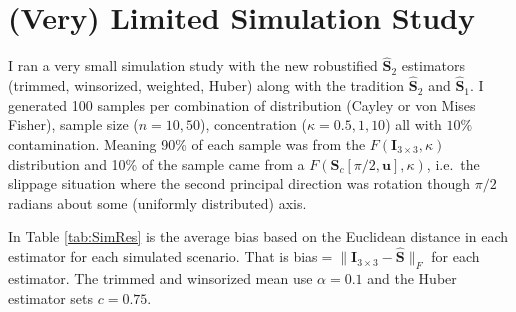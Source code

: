 \documentclass{article}\usepackage[]{graphicx}\usepackage[]{color}
\newcommand{\ProjMean}{{\widehat{\bm S}_{2}}}
\newcommand{\ProjMedian}{{\widehat{\bm S}_{1}}}
\begin{document}
% 








\section{(Very) Limited Simulation Study}

I ran a very small simulation study with the new robustified $\ProjMean$ estimators (trimmed, winsorized, weighted, Huber) along with the tradition $\ProjMean$ and $\ProjMedian$.  I generated 100 samples per combination of distribution (Cayley or von Mises Fisher), sample size ($n=10,50$), concentration ($\kappa=0.5,1,10$) all with $10\%$ contamination.  Meaning 90\% of each sample was from the $F(\bm I_{3\times 3},\kappa)$ distribution and 10\% of the sample came from a $F(\bm S_c[\pi/2,\bm u],\kappa)$, i.e.~the slippage situation where the second principal direction was rotation though $\pi/2$ radians about some (uniformly distributed) axis.

In Table \ref{tab:SimRes} is the average bias based on the Euclidean distance in each estimator for each simulated scenario.  That is bias$=\|\bm I_{3\times 3}-\widehat{\bm S}\|_F$ for each estimator.  The trimmed and winsorized mean use $\alpha=0.1$ and the Huber estimator sets $c=0.75$.
\end{document}

